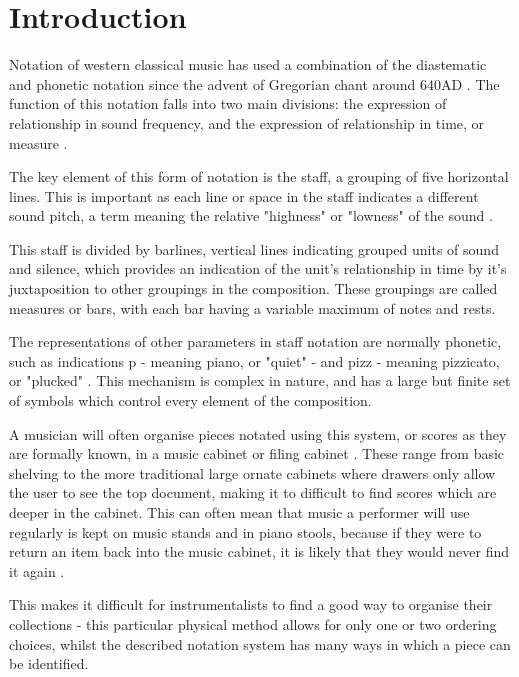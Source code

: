 \section{Introduction}
Notation of western classical music has used a combination of the diastematic and phonetic notation \parencite{RRastall} since the advent of Gregorian chant around 640AD \parencite{RTaruskin}. The function of this notation falls into two main divisions: the expression of relationship in sound frequency, and the expression of relationship in time, or measure \parencite{oxHistory}.

The key element of this form of notation is the staff, a grouping of five horizontal lines. This is important as each line or space in the staff indicates a different sound pitch, a term meaning the relative "highness" or "lowness" of the sound \parencite{classroom}.

This staff is divided by barlines, vertical lines indicating grouped units of sound and silence, which provides an indication of the unit's relationship in time by it's juxtaposition to other groupings in the composition. These groupings are called measures or bars, with each bar having a variable maximum of notes and rests. 

The representations of other parameters in staff notation are normally phonetic, such as indications p - meaning piano, or "quiet" - and pizz - meaning pizzicato, or "plucked" \parencite{RRastall}. This mechanism is complex in nature, and has a large but finite set of symbols which control every element of the composition.

A musician will often organise pieces notated using this system, or scores as they are formally known, in a music cabinet or filing cabinet \parencite{musicOrganising}. These range from basic shelving to the more traditional large ornate cabinets where drawers only allow the user to see the top document, making it to difficult to find scores which are deeper in the cabinet. This can often mean that music a performer will use regularly is kept on music stands and in piano stools, because if they were to return an item back into the music cabinet, it is likely that they would never find it again \parencite{SheetMusicRant}.

This makes it difficult for instrumentalists to find a good way to organise their collections - this particular physical method allows for only one or two ordering choices, whilst the described notation system has many ways in which a piece can be identified. 

